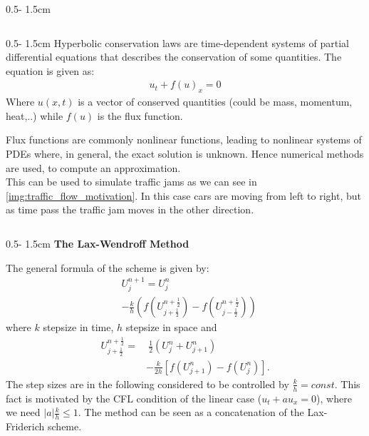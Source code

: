 \documentclass{uibposter}
\begin{document}
\begin{frame}[fragile]
\begin{columns}
\begin{column}{0.5\textwidth - 1.5cm}
\begin{column}{0.5\textwidth - 1.5cm}
Hyperbolic conservation laws are time-dependent systems of partial differential equations that describes the conservation of some quantities. The equation is given as:
\begin{align*}
    u_t + f(u)_x = 0
\end{align*}
Where $u(x,t)$ is a vector of conserved quantities (could be mass, momentum, heat,..) while $f(u)$ is the flux function.

Flux functions are commonly nonlinear functions, leading to nonlinear systems of PDEs where, in general, the exact solution is unknown. Hence numerical methods are used, to compute an approximation. \\
This can be used to simulate traffic jams as we can see in \cref{img:traffic_flow_motivation}. In this case cars are moving from left to right, but as time pass the traffic jam moves in the other direction. 

\end{column}
\begin{column}{0.5\textwidth - 1.5cm}
\textbf{The Lax-Wendroff Method}
\vspace{-1cm}

The general formula of the scheme is given by:
\begin{align*}
&U_j^{n+1} = U_j^n\\
&- \frac{k}{h}\left(f\left(U_{j+\frac{1}{2}}^{n+\frac{1}{2}}\right) - f\left(U_{j-\frac{1}{2}}^{n+\frac{1}{2}}\right)\right)
\end{align*}
where $k$ stepsize in time, $h$ stepsize in space and
\begin{align*}
U_{j+\frac{1}{2}}^{n+\frac{1}{2}} =&~ \frac{1}{2} (U_j^n + U_{j+1}^n)\\
&- \frac{k}{2h}[f(U_{j+1}^n) - f(U_j^n)].
\end{align*}
The step sizes are in the following considered to be controlled by $\frac{k}{h} = const$. This fact is motivated by the CFL condition of the linear case ($u_t + au_x = 0$), where we need $|a|\frac{k}{h} \leq 1$. 
The method can be seen as a concatenation of the Lax-Friderich scheme.


\end{column}
\end{column}
\end{columns}
\end{frame}
\end{document}

